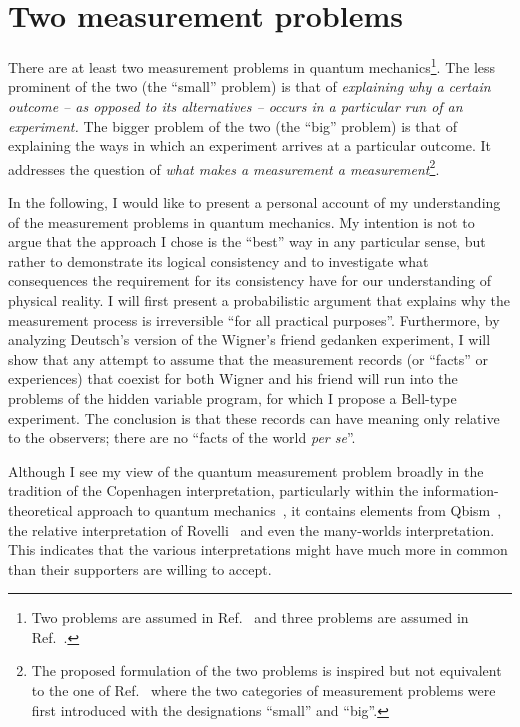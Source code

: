 \documentclass[12pt]{article}
\begin{document}
\setcounter{page}{1}
\section{Two measurement problems}

There are at least two measurement problems in quantum mechanics\footnote{Two problems are assumed in Ref.~\cite{bub,pitowsky} and three problems are assumed in Ref.~\cite{maudlin}.}. The less prominent of the two (the ``small'' problem) is that of {\em explaining why a certain outcome -- as opposed to its alternatives -- occurs in a particular run of an experiment.} The bigger problem of the two (the ``big'' problem) is that of explaining the ways in which an experiment arrives at a particular outcome. It addresses the question of {\em what makes a measurement a measurement}\footnote{The proposed formulation of the two problems is inspired but not equivalent to the one of Ref.~\cite{bub,pitowsky} where the two categories of measurement problems were first introduced with the designations ``small'' and ``big''.}. 

In the following, I would like to present a personal account of my understanding of the measurement problems in quantum mechanics. My intention is not to argue that the approach I chose is the ``best'' way in any particular sense, but rather to demonstrate its logical consistency and to investigate what consequences the requirement for its consistency have for our understanding of physical reality. I will first present a probabilistic argument that explains why the measurement process is irreversible ``for all practical purposes''. Furthermore, by analyzing Deutsch's version of the Wigner's friend gedanken experiment, I will show that any attempt to assume that the measurement records (or ``facts'' or experiences) that coexist for both Wigner and his friend will run into the problems of the hidden variable program, for which I propose a Bell-type experiment. The conclusion is that these records can have meaning only relative to the observers; there are no ``facts of the world {\it per se}''.

Although I see my view of the quantum measurement problem broadly in the tradition of the Copenhagen interpretation, particularly within the information-theoretical approach to quantum mechanics~\cite{cbaz}, it contains elements from Qbism~\cite{qbism}, the relative interpretation of Rovelli~\cite{rovelli} and even the many-worlds interpretation. This indicates that the various interpretations might have much more in common than their supporters are willing to accept.
\end{document}
